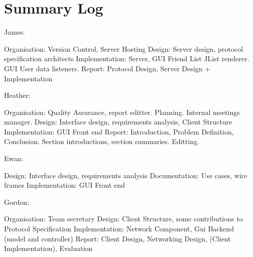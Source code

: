 \section{Summary Log}
\label{sumlog}

James:

Organisation: Version Control, Server Hosting
Design: Server design, protocol specification architects
Implementation: Server, GUI Friend List JList renderer. GUI User data listeners.
Report: Protocol Design, Server Design + Implementation

Heather:

Organisation: Quality Assurance, report editter. Planning. Internal meetings manager.
Design: Interface design, requirements analysis, Client Structure
Implementation: GUI Front end
Report: Introduction, Problem Definition, Conclusion. Section introductions, section summaries. Editting. 


Ewan:

Design: Interface design, requirements analysis
Documentation: Use cases, wire frames
Implementation: GUI Front end

Gordon:

Organisation: Team secretary
Design: Client Structure, some contributions to Protocol Specification 
Implementation: Network Component, Gui Backend (model and controller)
Report: Client Design, Networking Design, (Client Implementation), Evaluation
